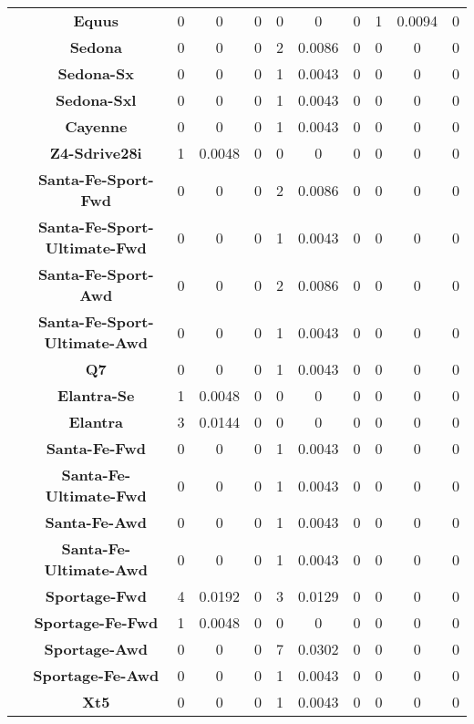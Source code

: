 \begin{center}
\begin{tabular}{|c|c||@{\hspace{1ex}}||c|c|c||@{\hspace{1ex}}||c|c|c||@{\hspace{1ex}}||c|c|c||@{\hspace{1ex}}||}
\cline{2-11}
  & {\bf Equus} & 0 & 0 & 0 & 0 & 0 & 0 & 1 & 0.0094 & 0 \\
\cline{2-11}
  & {\bf Sedona} & 0 & 0 & 0 & 2 & 0.0086 & 0 & 0 & 0 & 0 \\
\cline{2-11}
  & {\bf Sedona-Sx} & 0 & 0 & 0 & 1 & 0.0043 & 0 & 0 & 0 & 0 \\
\cline{2-11}
  & {\bf Sedona-Sxl} & 0 & 0 & 0 & 1 & 0.0043 & 0 & 0 & 0 & 0 \\
\cline{2-11}
  & {\bf Cayenne} & 0 & 0 & 0 & 1 & 0.0043 & 0 & 0 & 0 & 0 \\
\cline{2-11}
  & {\bf Z4-Sdrive28i} & 1 & 0.0048 & 0 & 0 & 0 & 0 & 0 & 0 & 0 \\
\cline{2-11}
  & {\bf Santa-Fe-Sport-Fwd} & 0 & 0 & 0 & 2 & 0.0086 & 0 & 0 & 0 & 0 \\
\cline{2-11}
  & {\bf Santa-Fe-Sport-Ultimate-Fwd} & 0 & 0 & 0 & 1 & 0.0043 & 0 & 0 & 0 & 0 \\
\cline{2-11}
  & {\bf Santa-Fe-Sport-Awd} & 0 & 0 & 0 & 2 & 0.0086 & 0 & 0 & 0 & 0 \\
\cline{2-11}
  & {\bf Santa-Fe-Sport-Ultimate-Awd} & 0 & 0 & 0 & 1 & 0.0043 & 0 & 0 & 0 & 0 \\
\cline{2-11}
  & {\bf Q7} & 0 & 0 & 0 & 1 & 0.0043 & 0 & 0 & 0 & 0 \\
\cline{2-11}
  & {\bf Elantra-Se} & 1 & 0.0048 & 0 & 0 & 0 & 0 & 0 & 0 & 0 \\
\cline{2-11}
  & {\bf Elantra} & 3 & 0.0144 & 0 & 0 & 0 & 0 & 0 & 0 & 0 \\
\cline{2-11}
  & {\bf Santa-Fe-Fwd} & 0 & 0 & 0 & 1 & 0.0043 & 0 & 0 & 0 & 0 \\
\cline{2-11}
  & {\bf Santa-Fe-Ultimate-Fwd} & 0 & 0 & 0 & 1 & 0.0043 & 0 & 0 & 0 & 0 \\
\cline{2-11}
  & {\bf Santa-Fe-Awd} & 0 & 0 & 0 & 1 & 0.0043 & 0 & 0 & 0 & 0 \\
\cline{2-11}
  & {\bf Santa-Fe-Ultimate-Awd} & 0 & 0 & 0 & 1 & 0.0043 & 0 & 0 & 0 & 0 \\
\cline{2-11}
  & {\bf Sportage-Fwd} & 4 & 0.0192 & 0 & 3 & 0.0129 & 0 & 0 & 0 & 0 \\
\cline{2-11}
  & {\bf Sportage-Fe-Fwd} & 1 & 0.0048 & 0 & 0 & 0 & 0 & 0 & 0 & 0 \\
\cline{2-11}
  & {\bf Sportage-Awd} & 0 & 0 & 0 & 7 & 0.0302 & 0 & 0 & 0 & 0 \\
\cline{2-11}
  & {\bf Sportage-Fe-Awd} & 0 & 0 & 0 & 1 & 0.0043 & 0 & 0 & 0 & 0 \\
\cline{2-11}
  & {\bf Xt5} & 0 & 0 & 0 & 1 & 0.0043 & 0 & 0 & 0 & 0 \\

\end{tabular}
\end{center}
